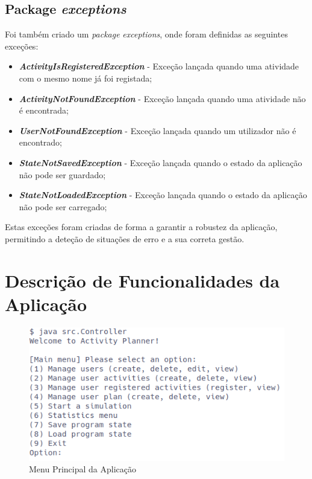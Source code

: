 \documentclass[a4paper,12pt]{scrreprt}
\begin{document}
\section{Package \textit{exceptions}}
    \label{sec:exceptions}
    Foi também criado um \textit{package} \textit{exceptions}, onde foram definidas as seguintes exceções:

    \begin{itemize}
        \item \textit{\textbf{ActivityIsRegisteredException}} - Exceção lançada quando uma atividade com o mesmo nome já foi registada;
        \item \textit{\textbf{ActivityNotFoundException}} - Exceção lançada quando uma atividade não é encontrada;
        \item \textit{\textbf{UserNotFoundException}} - Exceção lançada quando um utilizador não é encontrado;
        \item \textit{\textbf{StateNotSavedException}} - Exceção lançada quando o estado da aplicação não pode ser guardado;
        \item \textit{\textbf{StateNotLoadedException}} - Exceção lançada quando o estado da aplicação não pode ser carregado;
    \end{itemize}

    Estas exceções foram criadas de forma a garantir a robustez da aplicação,
    permitindo a deteção de situações de erro e a sua correta gestão.



\chapter{Descrição de Funcionalidades da Aplicação}
\begin{figure}[!ht]
    \centering
    \includegraphics[width=\textwidth]{images/mainMenu.png}
    \caption{Menu Principal da Aplicação}
    \label{fig:menu-main}
\end{figure}
\end{document}
